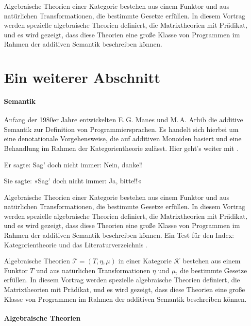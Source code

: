 Algebraische Theorien einer Kategorie bestehen aus einem Funktor und
aus natürlichen Transformationen, die bestimmte Gesetze erfüllen. In
diesem Vortrag werden spezielle algebraische Theorien definiert, die
Matrixtheorien mit Prädikat, und es wird gezeigt, dass diese Theorien
eine große Klasse von Programmen im Rahmen der additiven Semantik
beschreiben können.

\section{Ein weiterer Abschnitt}

\paragraph{Semantik}

Anfang der 1980er Jahre entwickelten E.\,G. Manes und M.\,A. Arbib die
additive Semantik zur Definition von Programmiersprachen. Es handelt
sich hierbei um eine denotationale Vorgehensweise, die auf additiven
Monoiden basiert und eine Behandlung im Rahmen der Kategorientheorie
zulässt. Hier geht's weiter mit \cite{lit01}.\gruppe\abelsch

Er sagte: {\glqq}Sag' doch nicht immer: {\glq}Nein, danke!{\grq}!{\grqq}

Sie sagte: »Sag' doch nicht immer: {\frq}Ja, bitte!{\flq}!«

Algebraische Theorien einer Kategorie bestehen aus einem Funktor und
aus natürlichen Transformationen, die bestimmte Gesetze erfüllen. In
diesem Vortrag werden spezielle algebraische Theorien definiert, die
Matrixtheorien mit Prädikat, und es wird gezeigt, dass diese Theorien
eine große Klasse von Programmen im Rahmen der additiven Semantik
beschreiben können. Ein Test für den Index:
Kategorientheorie und
das Literaturverzeichnis \cite{lit02,lit03}.

Algebraische Theorien $\mathcal{T}=(T,\eta,\mu)$ in einer Kategorie
$\mathcal{K}$ bestehen aus einem Funktor $T$ und aus natürlichen
Transformationen $\eta$ und $\mu$, die bestimmte Gesetze erfüllen. In
diesem Vortrag werden spezielle algebraische Theorien definiert, die
Matrixtheorien mit Prädikat, und es wird gezeigt, dass diese Theorien
eine große Klasse von Programmen im Rahmen der additiven Semantik
beschreiben können.

\paragraph{Algebraische Theorien}

